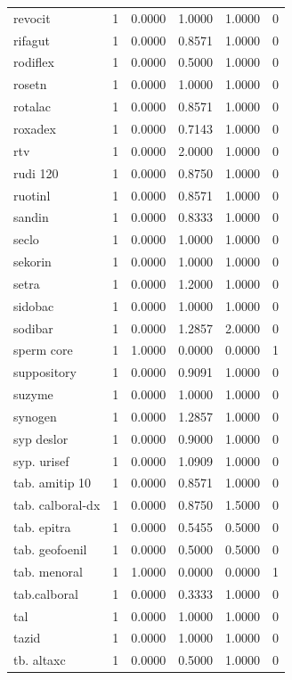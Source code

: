 \begin{longtable}{p{3.0cm}rrrrr}
revocit & 1 & 0.0000 & 1.0000 & 1.0000 & 0 \\
rifagut & 1 & 0.0000 & 0.8571 & 1.0000 & 0 \\
rodiflex & 1 & 0.0000 & 0.5000 & 1.0000 & 0 \\
rosetn & 1 & 0.0000 & 1.0000 & 1.0000 & 0 \\
rotalac & 1 & 0.0000 & 0.8571 & 1.0000 & 0 \\
roxadex & 1 & 0.0000 & 0.7143 & 1.0000 & 0 \\
rtv & 1 & 0.0000 & 2.0000 & 1.0000 & 0 \\
rudi 120 & 1 & 0.0000 & 0.8750 & 1.0000 & 0 \\
ruotinl & 1 & 0.0000 & 0.8571 & 1.0000 & 0 \\
sandin & 1 & 0.0000 & 0.8333 & 1.0000 & 0 \\
seclo & 1 & 0.0000 & 1.0000 & 1.0000 & 0 \\
sekorin & 1 & 0.0000 & 1.0000 & 1.0000 & 0 \\
setra & 1 & 0.0000 & 1.2000 & 1.0000 & 0 \\
sidobac & 1 & 0.0000 & 1.0000 & 1.0000 & 0 \\
sodibar & 1 & 0.0000 & 1.2857 & 2.0000 & 0 \\
sperm core & 1 & 1.0000 & 0.0000 & 0.0000 & 1 \\
suppository & 1 & 0.0000 & 0.9091 & 1.0000 & 0 \\
suzyme & 1 & 0.0000 & 1.0000 & 1.0000 & 0 \\
synogen & 1 & 0.0000 & 1.2857 & 1.0000 & 0 \\
syp deslor & 1 & 0.0000 & 0.9000 & 1.0000 & 0 \\
syp. urisef & 1 & 0.0000 & 1.0909 & 1.0000 & 0 \\
tab. amitip 10 & 1 & 0.0000 & 0.8571 & 1.0000 & 0 \\
tab. calboral-dx & 1 & 0.0000 & 0.8750 & 1.5000 & 0 \\
tab. epitra & 1 & 0.0000 & 0.5455 & 0.5000 & 0 \\
tab. geofoenil & 1 & 0.0000 & 0.5000 & 0.5000 & 0 \\
tab. menoral & 1 & 1.0000 & 0.0000 & 0.0000 & 1 \\
tab.calboral & 1 & 0.0000 & 0.3333 & 1.0000 & 0 \\
tal & 1 & 0.0000 & 1.0000 & 1.0000 & 0 \\
tazid & 1 & 0.0000 & 1.0000 & 1.0000 & 0 \\
tb. altaxc & 1 & 0.0000 & 0.5000 & 1.0000 & 0 \\

\end{longtable}
